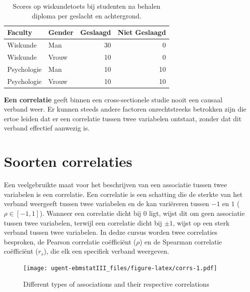 \documentclass[
]{book}
\theoremstyle{definition}
\theoremstyle{definition}
\theoremstyle{definition}
\theoremstyle{definition}
\theoremstyle{remark}
\begin{document}
\begin{table}

\caption{\label{tab:cond}Scores op wiskundetoets bij studenten na behalen diploma per geslacht en achtergrond.}
\centering
\begin{tabular}[t]{llrr}
\toprule
Faculty & Gender & Geslaagd & Niet Geslaagd\\
\midrule
Wiskunde & Man & 30 & 0\\
Wiskunde & Vrouw & 10 & 0\\
Psychologie & Man & 10 & 10\\
Psychologie & Vrouw & 10 & 10\\
\bottomrule
\end{tabular}
\end{table}

\textbf{Een correlatie} geeft binnen een cross-sectionele studie nooit een causaal verband weer. Er kunnen steeds andere factoren onrechtstreeks betrokken zijn die ertoe leiden dat er een correlatie tussen twee variabelen ontstaat, zonder dat dit verband effectief aanwezig is.

\hypertarget{soorten-correlaties}{%
\section*{Soorten correlaties}\label{soorten-correlaties}}


Een veelgebruikte maat voor het beschrijven van een associatie tussen twee variabelen is een correlatie. Een correlatie is een schatting die de sterkte van het verband weergeeft tussen twee variabelen en de kan variëreren tussen \(-1\) en \(1\) (\(\rho \in [-1, 1]\)). Wanneer een correlatie dicht bij \(0\) ligt, wijst dit om geen associatie tussen twee variabelen, terwijl een correlatie dicht bij \(\pm 1\), wijst op een sterk verband tussen twee variabelen. In dedze cursus worden twee correlaties besproken, de Pearson correlatie coëfficiënt (\(\rho\)) en de Spearman correlatie coëfficiënt (\(r_s\)), die elk een specifiek verband weergeven.

\begin{figure}
\centering
\texttt{[image: ugent-ebmstatIII\_files/figure-latex/corrs-1.pdf]}
\caption{\label{fig:corrs}Different types of associations and their respective correlations}
\end{figure}
\end{document}

